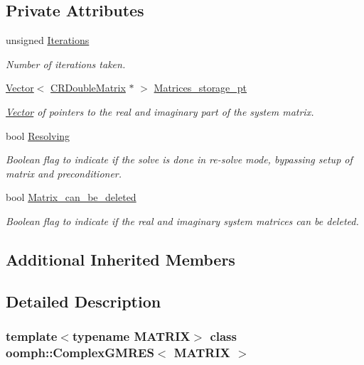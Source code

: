 \subsection*{Private Attributes}
\begin{DoxyCompactItemize}
\item 
unsigned \hyperlink{classoomph_1_1ComplexGMRES_a208aaa9528d6b08afa5324f77ac70581}{Iterations}
\begin{DoxyCompactList}\small\item\em Number of iterations taken. \end{DoxyCompactList}\item 
\hyperlink{classoomph_1_1Vector}{Vector}$<$ \hyperlink{classoomph_1_1CRDoubleMatrix}{C\+R\+Double\+Matrix} $\ast$ $>$ \hyperlink{classoomph_1_1ComplexGMRES_adfd862b611a335b5d6872a9eb37aa193}{Matrices\+\_\+storage\+\_\+pt}
\begin{DoxyCompactList}\small\item\em \hyperlink{classoomph_1_1Vector}{Vector} of pointers to the real and imaginary part of the system matrix. \end{DoxyCompactList}\item 
bool \hyperlink{classoomph_1_1ComplexGMRES_a2694315efaf2aa353ad4d67f316b1597}{Resolving}
\begin{DoxyCompactList}\small\item\em Boolean flag to indicate if the solve is done in re-\/solve mode, bypassing setup of matrix and preconditioner. \end{DoxyCompactList}\item 
bool \hyperlink{classoomph_1_1ComplexGMRES_aa38fa18230fc30f271d59481ccee3b55}{Matrix\+\_\+can\+\_\+be\+\_\+deleted}
\begin{DoxyCompactList}\small\item\em Boolean flag to indicate if the real and imaginary system matrices can be deleted. \end{DoxyCompactList}\end{DoxyCompactItemize}
\subsection*{Additional Inherited Members}


\subsection{Detailed Description}
\subsubsection*{template$<$typename M\+A\+T\+R\+IX$>$\newline
class oomph\+::\+Complex\+G\+M\+R\+E\+S$<$ M\+A\+T\+R\+I\+X $>$}

